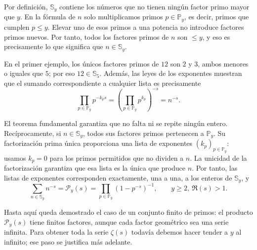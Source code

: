 \documentclass[11pt,a4paper]{article}
\begin{document}
Por definición, $\mathbb{S}_y$ contiene los números que no tienen
ningún factor primo mayor que $y$. En la fórmula de $n$ solo multiplicamos
primos $p\in\mathbb{P}_y$, es decir, primos que cumplen $p\le y$. Elevar
uno de esos primos a una potencia no introduce factores primos nuevos. Por
tanto, todos los factores primos de $n$ son $\le y$, y eso es precisamente
lo que significa que $n\in\mathbb{S}_y$.

En el primer ejemplo, los únicos factores primos de $12$ son $2$ y $3$,
ambos menores o iguales que $5$; por eso $12\in\mathbb{S}_5$. Además, las
leyes de los exponentes muestran que el sumando correspondiente a cualquier
lista es precisamente
\[
  \prod_{p\in\mathbb{P}_y}p^{-k_ps}
  =\left(\prod_{p\in\mathbb{P}_y}p^{k_p}\right)^{-s}
  =n^{-s}.
\]

El teorema fundamental garantiza que no falta ni se repite ningún
entero. Recíprocamente, si $n\in\mathbb{S}_y$, todos sus factores primos
pertenecen a $\mathbb{P}_y$. Su factorización prima única proporciona una
lista de exponentes $(k_p)_{p\in\mathbb{P}_y}$: usamos $k_p=0$ para los primos
permitidos que no dividen a $n$. La unicidad de la factorización garantiza que
esa lista es la única que produce $n$. Por tanto, las listas de exponentes
corresponden exactamente, una a una, a los enteros de $\mathbb{S}_y$, y
\[
  \sum_{n\in\mathbb{S}_y}n^{-s}
  =\mathscr{P}_y(s)
  =\prod_{p\in\mathbb{P}_y}(1-p^{-s})^{-1},
  \qquad y\ge2,\ \Re(s)>1.
\]

Hasta aquí queda demostrado el caso de un conjunto finito de primos: el producto
$\mathscr{P}_y(s)$ tiene finitos factores, aunque cada factor geométrico sea una serie
infinita. Para obtener toda la serie $\zeta(s)$ todavía debemos hacer tender
a $y$ al infinito; ese paso se justifica más adelante.
\end{document}
